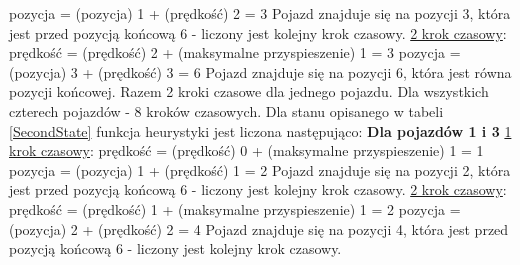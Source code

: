 \newline
pozycja = (pozycja) 1 + (prędkość) 2 = 3
\newline
\newline
Pojazd znajduje się na pozycji 3, która jest przed pozycją końcową 6 - liczony jest kolejny krok czasowy.
\newline
\newline
\underline{2 krok czasowy}:
\newline
\newline
prędkość = (prędkość) 2 + (maksymalne przyspieszenie) 1 = 3
\newline
pozycja = (pozycja) 3 + (prędkość) 3 = 6
\newline
\newline
Pojazd znajduje się na pozycji 6, która jest równa pozycji końcowej.
\newline
\newline
Razem 2 kroki czasowe dla jednego pojazdu. Dla wszystkich czterech pojazdów - 8 kroków czasowych.
\newline
\newline
\newline
Dla stanu opisanego w tabeli \ref{SecondState} funkcja heurystyki jest liczona następująco:
\newline
\newline
\textbf{Dla pojazdów 1 i 3}
\newline
\newline
\underline{1 krok czasowy}:
\newline
\newline
prędkość = (prędkość) 0 + (maksymalne przyspieszenie) 1 = 1
\newline
pozycja = (pozycja) 1 + (prędkość) 1 = 2
\newline
\newline
Pojazd znajduje się na pozycji 2, która jest przed pozycją końcową 6 - liczony jest kolejny krok czasowy.
\newline
\newline
\underline{2 krok czasowy}:
\newline
\newline
prędkość = (prędkość) 1 + (maksymalne przyspieszenie) 1 = 2
\newline
pozycja = (pozycja) 2 + (prędkość) 2 = 4
\newline
\newline
Pojazd znajduje się na pozycji 4, która jest przed pozycją końcową 6 - liczony jest kolejny krok czasowy.
\newline
